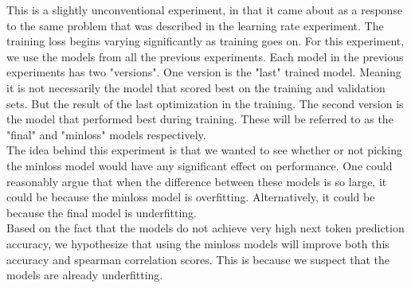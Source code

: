 This is a slightly unconventional experiment, in that it came about as a response to the same problem that was described in the learning rate experiment. The training loss begins varying significantly as training goes on. For this experiment, we use the models from all the previous experiments. Each model in the previous experiments has two "versions". One version is the "last" trained model. Meaning it is not necessarily the model that scored best on the training and validation sets. But the result of the last optimization in the training. The second version is the model that performed best during training. These will be referred to as the "final" and "minloss" models respectively.\\

\noindent
The idea behind this experiment is that we wanted to see whether or not picking the minloss model would have any significant effect on performance. One could reasonably argue that when the difference between these models is so large, it could be because the minloss model is overfitting. Alternatively, it could be because the final model is underfitting.\\

\noindent
Based on the fact that the models do not achieve very high next token prediction accuracy, we hypothesize that using the minloss models will improve both this accuracy and spearman correlation scores. This is because we suspect that the models are already underfitting.